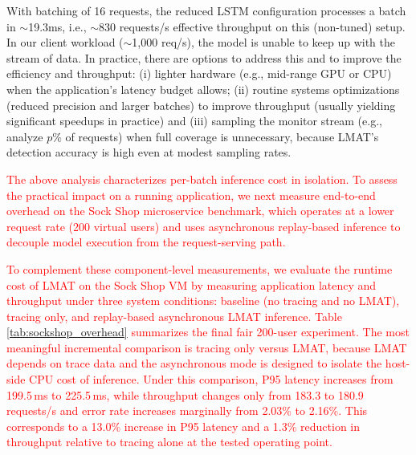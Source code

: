 \documentclass[preprint,12pt]{elsarticle}
\begin{document}
With batching of 16 requests, the reduced LSTM configuration processes a batch in \(\sim\)19.3ms, i.e., \(\sim\)830 requests/s effective throughput on this (non-tuned) setup. In our client workload ($\sim$1{,}000 req/s), the model is unable to keep up with the stream of data. In practice, there are options to address this and to improve the efficiency and throughput: (i) lighter hardware (e.g., mid-range GPU or CPU) when the application’s latency budget allows; (ii) routine systems optimizations (reduced precision and larger batches) to improve throughput (usually yielding significant speedups in practice) and (iii) sampling the monitor stream (e.g., analyze \(p\%\) of requests) when full coverage is unnecessary, because LMAT’s detection accuracy is high even at modest sampling rates.

\textcolor{red}{The above analysis characterizes per-batch inference cost in isolation. To assess the practical impact on a running application, we next measure end-to-end overhead on the Sock Shop microservice benchmark, which operates at a lower request rate (200 virtual users) and uses asynchronous replay-based inference to decouple model execution from the request-serving path.}


\textcolor{red}{To complement these component-level measurements, we evaluate the runtime cost of LMAT on the Sock Shop VM by measuring application latency and throughput under three system conditions: baseline (no tracing and no LMAT), tracing only, and replay-based asynchronous LMAT inference. Table \ref{tab:sockshop_overhead} summarizes the final fair 200-user experiment. The most meaningful incremental comparison is tracing only versus LMAT, because LMAT depends on trace data and the asynchronous mode is designed to isolate the host-side CPU cost of inference. Under this comparison, P95 latency increases from 199.5\,ms to 225.5\,ms, while throughput changes only from 183.3 to 180.9 requests/s and error rate increases marginally from 2.03\% to 2.16\%. This corresponds to a 13.0\% increase in P95 latency and a 1.3\% reduction in throughput relative to tracing alone at the tested operating point.}

\begin{table}[tb]
\centering
\caption{\textcolor{red}{Sock Shop application-level overhead at 200 virtual users under the fair rotated protocol. The LMAT condition is a replay-based asynchronous inference proxy running concurrently with fresh application traffic.}}
\label{tab:sockshop_overhead}
{\color{red}
\setlength{\tabcolsep}{6pt}
\renewcommand{\arraystretch}{1.1}
}
\end{table}
\end{document}
